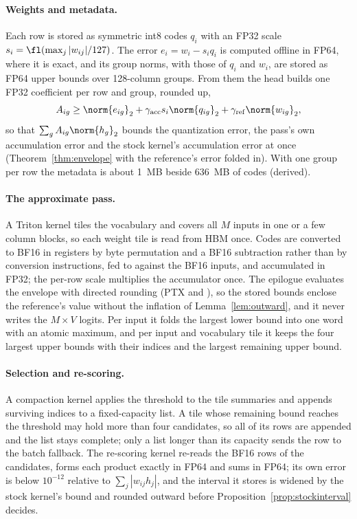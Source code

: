 \paragraph{Weights and metadata.} Each row is stored as symmetric int8 codes $q_i$ with an FP32 scale $s_i=\fl(\max_j|w_{ij}|/127)$. The error $e_i=w_i-s_iq_i$ is computed offline in FP64, where it is exact, and its group norms, with those of $q_i$ and $w_i$, are stored as FP64 upper bounds over 128-column groups. From them the head builds one FP32 coefficient per row and group, rounded up,
\[A_{ig}\ge\norm{e_{ig}}_2+\gamma_{\rm acc}s_i\norm{q_{ig}}_2+\gamma_{\rm ref}\norm{w_{ig}}_2,\]
so that $\sum_gA_{ig}\norm{h_g}_2$ bounds the quantization error, the pass's own accumulation error and the stock kernel's accumulation error at once (Theorem~\ref{thm:envelope} with the reference's error folded in). With one group per row the metadata is about 1~MB beside 636~MB of codes (derived).

\paragraph{The approximate pass.} A Triton kernel tiles the vocabulary and covers all $M$ inputs in one or a few column blocks, so each weight tile is read from HBM once. Codes are converted to BF16 in registers by byte permutation and a BF16 subtraction rather than by conversion instructions, fed to  against the BF16 inputs, and accumulated in FP32; the per-row scale multiplies the accumulator once. The epilogue evaluates the envelope with directed rounding (PTX  and ), so the stored bounds enclose the reference's value without the inflation of Lemma~\ref{lem:outward}, and it never writes the $M\times V$ logits. Per input it folds the largest lower bound into one word with an atomic maximum, and per input and vocabulary tile it keeps the four largest upper bounds with their indices and the largest remaining upper bound.

\paragraph{Selection and re-scoring.} A compaction kernel applies the threshold to the tile summaries and appends surviving indices to a fixed-capacity list. A tile whose remaining bound reaches the threshold may hold more than four candidates, so all of its rows are appended and the list stays complete; only a list longer than its capacity sends the row to the batch fallback. The re-scoring kernel re-reads the BF16 rows of the candidates, forms each product exactly in FP64 and sums in FP64; its own error is below $10^{-12}$ relative to $\sum_j|w_{ij}h_j|$, and the interval it stores is widened by the stock kernel's bound and rounded outward before Proposition~\ref{prop:stockinterval} decides.

